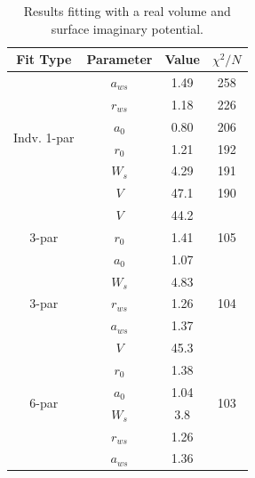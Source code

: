 \documentclass[]{scrartcl}
\begin{document}


\begin{table}
\centering
	\begin{tabular}{ c | c | c | c }
	Fit Type & Parameter & Value & $\chi ^2 / N$ \\
\hline
	\multirow{6}{*}{Indv. 1-par} & $a _{ws}$ & 1.49 & 258 \\
	& $r _{ws}$ & 1.18 & 226 \\
	& $a _0$ & 0.80 & 206 \\
	& $r _0$ & 1.21 & 192 \\
	& $W_s$ & 4.29 & 191 \\
	& $V$ & 47.1 & 190 \\
\hline
	\multirow{3}{*}{3-par} & $V$ & 44.2 & \multirow{3}{*}{105}\\
	& $r_0$ & 1.41 & \\
	& $a_0$ & 1.07 & \\
\hline
	\multirow{3}{*}{3-par} & $W_s$ & 4.83 & \multirow{3}{*}{104}\\
	& $r_{ws}$ & 1.26 & \\
	& $a_{ws}$ & 1.37 & \\
\hline
	\multirow{6}{*}{6-par} & $V$ & 45.3 & \multirow{6}{*}{103}\\
	& $r_0$ & 1.38 & \\
	& $a_0$ & 1.04 & \\
	& $W_{s}$ & 3.8 & \\
	& $r_{ws}$ & 1.26 & \\
	& $a_{ws}$ & 1.36 \\
\hline
	\end{tabular}
	\caption{Results fitting with a real volume and surface imaginary potential.}
	\label{tab:fitsurf}
\end{table}






\end{document}
